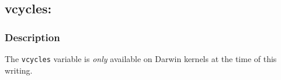 \clearpage
{}
{}
\label{vars:vcycles}
\subsection*{vcycles: }

\subsubsection*{Description}

The \verb|vcycles| variable is \emph{only} available on Darwin kernels
at the time of this writing.

